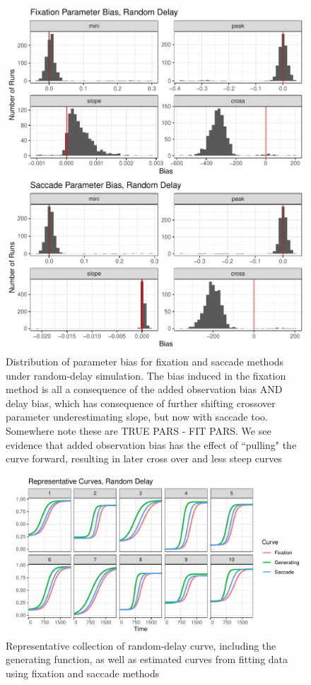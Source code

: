 \documentclass{article}
\begin{document}
\begin{figure}[H]
\centering
\includegraphics{random_delay_par_bias.pdf}
\caption{Distribution of parameter bias for fixation and saccade methods under random-delay simulation. The bias induced in the fixation method is all a consequence of the added observation bias AND delay bias, which has consequence of further shifting crossover parameter underestimating slope, but now with saccade too. Somewhere note these are TRUE PARS - FIT PARS. We see evidence that added observation bias has the effect of ``pulling" the curve forward, resulting in later cross over and less steep curves}
\label{fig:random_par_bias}
\end{figure}

\begin{figure}[H]
\centering
\includegraphics{random_pb_curves.pdf}
\caption{Representative collection of random-delay curve, including  the generating function, as well as estimated curves from fitting data using fixation and saccade methods}
\label{fig:random_pb_curves}
\end{figure}
\end{document}
